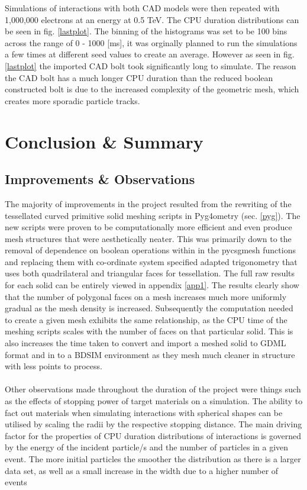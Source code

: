 \documentclass[12pt,a4paper]{article}
\begin{document}
\noindent Simulations of interactions with both CAD models were then repeated with 1,000,000 electrons at an energy at 0.5 TeV. The CPU duration distributions can be seen in fig. \ref{lastplot}. The binning of the histograms was set to be 100 bins across the range of 0 - 1000 [ms], it was orginally planned to run the simulations a few times at different seed values to create an average. However as seen in fig. \ref{lastplot} the imported CAD bolt took significantly long to simulate. The reason the CAD bolt has a much longer CPU duration than the reduced boolean constructed bolt is due to the increased complexity of the geometric mesh, which creates more sporadic particle tracks.

\newpage
\section{Conclusion \& Summary}
\label{conc}

\subsection{Improvements \& Observations}

The majority of improvements in the project resulted from the rewriting of the tessellated curved primitive solid meshing scripts in Pyg4ometry (sec. \ref{pyg}). The new scripts were proven to be computationally more efficient and even produce mesh structures that were aesthetically neater. This was primarily down to the removal of dependence on boolean operations within in the pycsgmesh functions and replacing them with co-ordinate system specified adapted trigonometry that uses both quadrilateral and triangular faces for tessellation. The full raw results for each solid can be entirely viewed in appendix \ref{app1}. The results clearly show that the number of polygonal faces on a mesh increases much more uniformly gradual as the mesh density is increased. Subsequently the computation needed to create a given mesh exhibits the same relationship, as the CPU time of the meshing scripts scales with the number of faces on that particular solid. This is also increases the time taken to convert and import a meshed solid to GDML format and in to a BDSIM environment as they mesh much cleaner in structure with less points to process. 
\\\\
Other observations made throughout the duration of the project were things such as the effects of stopping power of target materials on a simulation. The ability to fact out materials when simulating interactions with spherical shapes can be utilised by scaling the radii by the respective stopping distance. The main driving factor for the properties of CPU duration distributions of interactions is governed by the energy of the incident particle/s and the number of particles in a given event. The more initial particles the smoother the distribution as there is a larger data set, as well as a small increase in the width due to a higher number of events 
\end{document}
